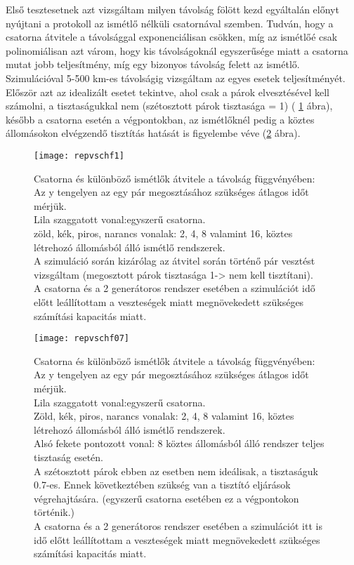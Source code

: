 Első tesztesetnek azt vizsgáltam milyen távolság fölött kezd egyáltalán előnyt nyújtani a protokoll az ismétlő nélküli csatornával szemben. Tudván, hogy a csatorna átvitele a távolsággal exponenciálisan csökken, míg az ismétlőé csak polinomiálisan \cite{briegel1998quantum} azt várom, hogy kis távolságoknál egyszerűsége miatt a csatorna mutat jobb teljesítmény, míg egy bizonyos távolság felett az ismétlő. Szimulációval 5-500 km-es távolságig vizsgáltam az egyes esetek teljesítményét. Először azt az idealizált esetet tekintve, ahol csak a párok elvesztésével kell számolni, a tisztaságukkal nem (szétosztott párok tisztasága = 1) ( \ref{fig:csat1} ábra), később a csatorna esetén a végpontokban, az ismétlőknél pedig a köztes állomásokon elvégzendő tisztítás hatását is figyelembe véve (\ref{fig:csat2} ábra).
\begin{figure}[H]
\centering
\texttt{[image: repvschf1]}
\caption[Csatorna és ismétlők karakterisztikája 1]
{Csatorna és különböző ismétlők átvitele a távolság függvényében:\\
Az y tengelyen az egy pár megosztásához szükséges átlagos időt mérjük.\\
Lila szaggatott vonal:egyszerű csatorna.\\
zöld, kék, piros, narancs vonalak: 2, 4, 8 valamint 16, köztes létrehozó állomásból álló ismétlő rendszerek.\\
A szimuláció során kizárólag az átvitel során történő pár vesztést vizsgáltam (megosztott párok tisztasága 1-> nem kell tisztítani).\\
A csatorna és a 2 generátoros rendszer esetében a szimulációt idő előtt leállítottam a veszteségek miatt megnövekedett szükséges számítási kapacitás miatt.
}
\label{fig:csat1}
\end{figure}
\begin{figure}[H]
\centering
\texttt{[image: repvschf07]}
\caption[Csatorna és ismétlők karakterisztikája 2]
{Csatorna és különböző ismétlők átvitele a távolság függvényében:\\
Az y tengelyen az egy pár megosztásához szükséges átlagos időt mérjük.\\
Lila szaggatott vonal:egyszerű csatorna.\\
Zöld, kék, piros, narancs vonalak: 2, 4, 8 valamint 16, köztes létrehozó állomásból álló ismétlő rendszerek.\\
Alsó fekete pontozott vonal: 8 köztes állomásból álló rendszer teljes tisztaság esetén.\\
A szétosztott párok ebben az esetben nem ideálisak, a tisztaságuk 0.7-es. Ennek következtében szükség van a tisztító eljárások végrehajtására. (egyszerű csatorna esetében ez a végpontokon történik.)\\
A csatorna és a 2 generátoros rendszer esetében a szimulációt itt is idő előtt leállítottam a veszteségek miatt megnövekedett szükséges számítási kapacitás miatt.
}
\label{fig:csat2}
\end{figure}
